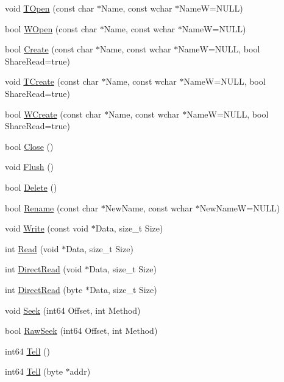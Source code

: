 \begin{DoxyCompactItemize}
\item 
void \hyperlink{class_file_a4d81ac5c1550fb1d45991bbaafc6d9a0}{T\-Open} (const char $\ast$Name, const wchar $\ast$Name\-W=N\-U\-L\-L)
\item 
bool \hyperlink{class_file_a6a4dead88fb112c2641fda5e4fa51f6f}{W\-Open} (const char $\ast$Name, const wchar $\ast$Name\-W=N\-U\-L\-L)
\item 
bool \hyperlink{class_file_a42b103889446cad09667c89d5ab0c323}{Create} (const char $\ast$Name, const wchar $\ast$Name\-W=N\-U\-L\-L, bool Share\-Read=true)
\item 
void \hyperlink{class_file_a4e9197e56f2c2fb669afe6713731734d}{T\-Create} (const char $\ast$Name, const wchar $\ast$Name\-W=N\-U\-L\-L, bool Share\-Read=true)
\item 
bool \hyperlink{class_file_a535a061342fa0814c3353bb9325fe0f4}{W\-Create} (const char $\ast$Name, const wchar $\ast$Name\-W=N\-U\-L\-L, bool Share\-Read=true)
\item 
bool \hyperlink{class_file_ad7ab440b2fba02aa291ecf5a00de8b8d}{Close} ()
\item 
void \hyperlink{class_file_a2791da7f792dcc2afb74eb6be78ab76b}{Flush} ()
\item 
bool \hyperlink{class_file_a840551732a156ad90a8d652d7b873402}{Delete} ()
\item 
bool \hyperlink{class_file_ad3fc3b622573a504300edc24a99003da}{Rename} (const char $\ast$New\-Name, const wchar $\ast$New\-Name\-W=N\-U\-L\-L)
\item 
void \hyperlink{class_file_aec61d0eefe6050f0c99fd25d4b7826a2}{Write} (const void $\ast$Data, size\-\_\-t Size)
\item 
int \hyperlink{class_file_a5744d4b49a30149b9e883d4cde735a01}{Read} (void $\ast$Data, size\-\_\-t Size)
\item 
int \hyperlink{class_file_add3a1b7186687db6e6ad1558b2f60efd}{Direct\-Read} (void $\ast$Data, size\-\_\-t Size)
\item 
int \hyperlink{class_file_ac17100017024ec51242e7502bc4e4472}{Direct\-Read} (byte $\ast$Data, size\-\_\-t Size)
\item 
void \hyperlink{class_file_a06c0ae1420585ff1c02c4755f4092e05}{Seek} (int64 Offset, int Method)
\item 
bool \hyperlink{class_file_adee143daa7c38172c7d84c7e7300b164}{Raw\-Seek} (int64 Offset, int Method)
\item 
int64 \hyperlink{class_file_a9613c522a3ec6a60d26b5b0c249857ec}{Tell} ()
\item 
int64 \hyperlink{class_file_a7d6bd1c7ef4aaf604c2c59726808d788}{Tell} (byte $\ast$addr)

\end{DoxyCompactItemize}
